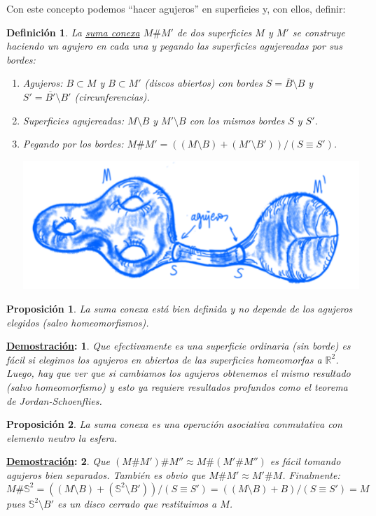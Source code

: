 \documentclass[10pt,a4paper,openright]{book}
\theoremstyle{break}
\newtheorem*{defi}{Definición}
\newtheorem*{prop}{Proposición}
\newtheorem*{demo}{\underline{Demostración}:}
\begin{document}
Con este concepto podemos ``hacer agujeros'' en superficies y, con ellos, definir:
\begin{defi}
La \underline{suma conexa} $M \# M'$ de dos superficies $M$ y $M'$ se construye haciendo un agujero en cada una y pegando las superficies agujereadas por sus bordes:
\begin{enumerate}
    \item Agujeros: $B \subset M$ y $B \subset M'$ (discos abiertos) con bordes $S = \overline{B} \setminus B$ y $S' = \overline{B'} \setminus B'$ (circunferencias).
    \item Superficies agujereadas: $M\setminus B$ y $M'\setminus B$ con los mismos bordes $S$ y $S'$.
    \item Pegando por los bordes: $M \# M' = \left( \left( M \setminus B \right) + \left( M' \setminus B' \right) \right) / \left( S \equiv S' \right)$.
    \begin{center}
        \includegraphics[scale=0.3]{images/def_suma_conexa} 
    \end{center}
\end{enumerate}
\end{defi}

\begin{prop}
La suma conexa está bien definida y no depende de los agujeros elegidos (salvo homeomorfismos).
\end{prop}
\begin{demo}
Que efectivamente es una superficie ordinaria (sin borde) es fácil si elegimos los agujeros en abiertos de las superficies homeomorfas a $\mathbb{R}^{2}$. Luego, hay que ver que si cambiamos los agujeros obtenemos el mismo resultado (salvo homeomorfismo) y esto ya requiere resultados profundos como el teorema de Jordan-Schoenflies.
\end{demo}

\begin{prop}
La suma conexa es una operación asociativa conmutativa con elemento neutro la esfera.
\end{prop}
\begin{demo}
Que $\left( M \# M' \right) \# M'' \approx M \# \left( M' \# M'' \right)$ es fácil tomando agujeros bien separados. También es obvio que $M \# M' \approx M' \# M$. Finalmente:
\[
M \# \mathbb{S}^{2} = \left( \left( M \setminus B \right) + \left( \mathbb{S}^{2} \setminus B' \right) \right) / \left( S \equiv S' \right) = \left( \left( M \setminus B \right) + B \right) / \left( S \equiv S' \right) = M
\]
pues $\mathbb{S}^{2} \setminus B'$ es un disco cerrado que restituimos a $M$.
\end{demo}
\end{document}
